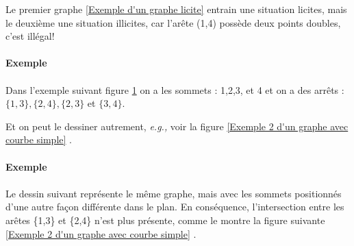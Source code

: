 \documentclass[hidelinks,letterpaper,12pt]{article}
\newcounter{Exemple} %
\begin{document}
Le premier graphe \ref{Exemple d'un graphe licite} entrain une situation licites, mais le deuxième une situation illicites, car l'arête (1,4) possède deux points doubles, c'est illégal! \citep{ChristianLaforest}
\\ \\	
\textbf{Exemple \theExemple {} \label{Courbe simple exemple 1}} 
\\ \\
Dans l'exemple suivant figure \ref{Exemple 1 d'un graphe avec courbe simple} on a les sommets : 1,2,3, et 4 et on a des arrêts : \( \{1,3\}, \{2,4\}, \{2,3\} \) et \( \{3,4\} \). 
\\
\begin{figure}[H]
\centering	
{} 
\label{Exemple 1 d'un graphe avec courbe simple}	
\end{figure}    	
Et on peut le dessiner autrement, \textit{e.g.,} voir la figure \ref{Exemple 2 d'un graphe avec courbe simple} \citep{ChristianLaforest}.
\\ \\ 
\textbf{Exemple \theExemple {} \label{Courbe simple exemple 2}}
\\ \\
Le dessin suivant représente le même graphe, mais avec les sommets positionnés d'une autre façon différente dans le plan. En conséquence, l'intersection entre les arêtes \{1,3\} et \{2,4\} n'est plus présente, comme le montre la figure suivante \ref{Exemple 2 d'un graphe avec courbe simple} \citep{ChristianLaforest}.
\end{document}
